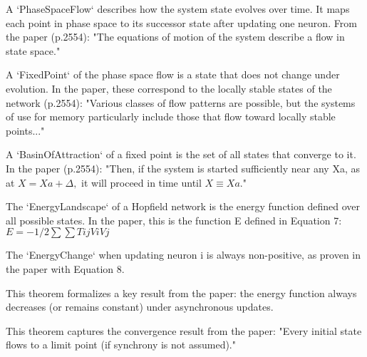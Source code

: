 \begin{definition}\label{PhaseSpaceFlow}
\leanok
A `PhaseSpaceFlow` describes how the system state evolves over time.
It maps each point in phase space to its successor state after updating one neuron.
From the paper (p.2554): "The equations of motion of the system describe a flow in state space."
\end{definition}


\begin{definition}\label{FixedPoint}
\leanok
A `FixedPoint` of the phase space flow is a state that does not change under evolution.
In the paper, these correspond to the locally stable states of the network (p.2554):
"Various classes of flow patterns are possible, but the systems of use for memory
particularly include those that flow toward locally stable points..."
\end{definition}


\begin{definition}\label{BasinOfAttraction}
\leanok
A `BasinOfAttraction` of a fixed point is the set of all states that converge to it.
In the paper (p.2554): "Then, if the system is started sufficiently near any Xa,
as at $X = Xa + \Delta,$ it will proceed in time until $X \equiv Xa.$"
\end{definition}


\begin{definition}\label{EnergyLandscape}
\leanok
The `EnergyLandscape` of a Hopfield network is the energy function defined over all possible states.
In the paper, this is the function E defined in Equation 7:
   $ E = -1/2 \sum \sum Tij Vi Vj$
\end{definition}


\begin{definition}\label{EnergyChange}
\leanok
The `EnergyChange` when updating neuron i is always non-positive,
as proven in the paper with Equation 8.

This theorem formalizes a key result from the paper: the energy function
always decreases (or remains constant) under asynchronous updates.
\end{definition}


\begin{definition}\label{convergence_to_fixed_point}
\leanok
This theorem captures the convergence result from the paper:
"Every initial state flows to a limit point (if synchrony is not assumed)."
\end{definition}

